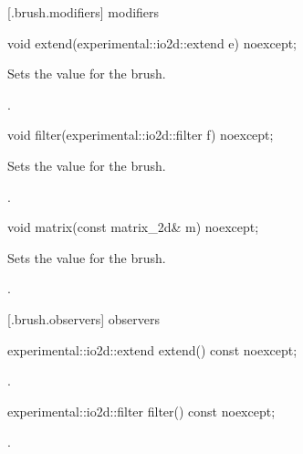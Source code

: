  [\iotwod.brush.modifiers]{ modifiers}

\begin{itemdecl}
    void extend(experimental::io2d::extend e) noexcept;
\end{itemdecl}
\begin{itemdescr}
	\pnum
	\effects
	Sets the  value for the brush.
	
	\pnum
	\postconditions
	.
	
\end{itemdescr}

\begin{itemdecl}
    void filter(experimental::io2d::filter f) noexcept;
\end{itemdecl}
\begin{itemdescr}
	\pnum
	\effects
	Sets the  value for the brush.
	
	\pnum
	\postconditions
	.
	
\end{itemdescr}

\begin{itemdecl}
    void matrix(const matrix_2d& m) noexcept;
\end{itemdecl}
\begin{itemdescr}
	\pnum
	\effects
	Sets the  value for the brush.
	
	\pnum
	\postconditions
	.
	
\end{itemdescr}

 [\iotwod.brush.observers]{ observers}

\begin{itemdecl}
    experimental::io2d::extend extend() const noexcept;
\end{itemdecl}
\begin{itemdescr}
	\pnum
	\returns
	.

\end{itemdescr}

\begin{itemdecl}
    experimental::io2d::filter filter() const noexcept;
\end{itemdecl}
\begin{itemdescr}
	\pnum
	\returns
	.

\end{itemdescr}

